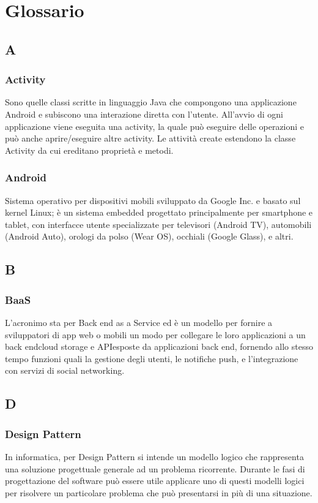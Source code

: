 \section{Glossario}
\subsection*{A}
\subsubsection*{Activity}
Sono quelle classi scritte in linguaggio Java che compongono una applicazione Android e subiscono una interazione diretta con l'utente. All'avvio di ogni applicazione viene eseguita una activity, la quale può eseguire delle operazioni e può anche aprire/eseguire altre activity. Le attività create estendono la classe Activity da cui ereditano proprietà e metodi.

\subsubsection*{Android}
Sistema operativo per dispositivi mobili sviluppato da Google Inc. e basato sul kernel Linux; è un sistema embedded progettato principalmente per smartphone e tablet, con interfacce utente
specializzate per televisori (Android TV), automobili (Android Auto), orologi da polso (Wear OS), occhiali (Google Glass), e altri.

\subsection*{B}
\subsubsection*{BaaS}
L'acronimo sta per Back end as a Service ed è un modello per fornire a sviluppatori di app web o mobili un modo per collegare le loro applicazioni a un back end\glosp cloud storage e API\glosp esposte da applicazioni back end, fornendo allo stesso tempo funzioni quali la gestione degli utenti, le notifiche push, e l'integrazione con servizi di social networking.

\subsection*{D}
\subsubsection*{Design Pattern}
In informatica, per Design Pattern si intende un modello logico che rappresenta una soluzione progettuale generale ad un problema ricorrente. Durante le fasi di progettazione del software può essere utile applicare uno di questi modelli logici per risolvere un particolare problema che può presentarsi in più di una situazione.

